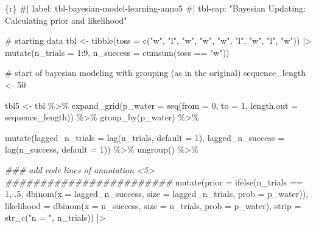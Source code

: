 \documentclass[
  letterpaper,
  DIV=11,
  numbers=noendperiod]{scrreprt}
\newenvironment{Shaded}{\begin{snugshade}}{\end{snugshade}}
\newcommand{\AttributeTok}[1]{\textcolor[rgb]{0.40,0.45,0.13}{#1}}
\newcommand{\CommentTok}[1]{\textcolor[rgb]{0.37,0.37,0.37}{#1}}
\newcommand{\DecValTok}[1]{\textcolor[rgb]{0.68,0.00,0.00}{#1}}
\newcommand{\DocumentationTok}[1]{\textcolor[rgb]{0.37,0.37,0.37}{\textit{#1}}}
\newcommand{\FunctionTok}[1]{\textcolor[rgb]{0.28,0.35,0.67}{#1}}
\newcommand{\InformationTok}[1]{\textcolor[rgb]{0.37,0.37,0.37}{#1}}
\newcommand{\NormalTok}[1]{\textcolor[rgb]{0.00,0.23,0.31}{#1}}
\newcommand{\OtherTok}[1]{\textcolor[rgb]{0.00,0.23,0.31}{#1}}
\newcommand{\SpecialCharTok}[1]{\textcolor[rgb]{0.37,0.37,0.37}{#1}}
\newcommand{\StringTok}[1]{\textcolor[rgb]{0.13,0.47,0.30}{#1}}
\begin{document}
\begin{Shaded}
\begin{Highlighting}[]
\InformationTok{\textasciigrave{}\textasciigrave{}\textasciigrave{}\{r\}}
\CommentTok{\#| label: tbl{-}bayesian{-}model{-}learning{-}anno5}
\CommentTok{\#| tbl{-}cap: "Bayesian Updating: Calculating prior and likelihood"}

\CommentTok{\# starting data}
\NormalTok{tbl }\OtherTok{\textless{}{-}} \FunctionTok{tibble}\NormalTok{(}\AttributeTok{toss =} \FunctionTok{c}\NormalTok{(}\StringTok{"w"}\NormalTok{, }\StringTok{"l"}\NormalTok{, }\StringTok{"w"}\NormalTok{, }\StringTok{"w"}\NormalTok{, }\StringTok{"w"}\NormalTok{, }\StringTok{"l"}\NormalTok{, }\StringTok{"w"}\NormalTok{, }\StringTok{"l"}\NormalTok{, }\StringTok{"w"}\NormalTok{)) }\SpecialCharTok{|\textgreater{}} 
    \FunctionTok{mutate}\NormalTok{(}\AttributeTok{n\_trials  =} \DecValTok{1}\SpecialCharTok{:}\DecValTok{9}\NormalTok{, }\AttributeTok{n\_success =} \FunctionTok{cumsum}\NormalTok{(toss }\SpecialCharTok{==} \StringTok{"w"}\NormalTok{))}

\CommentTok{\# start of bayesian modeling with grouping (as in the original)}
\NormalTok{sequence\_length }\OtherTok{\textless{}{-}} \DecValTok{50}

\NormalTok{tbl5 }\OtherTok{\textless{}{-}}\NormalTok{ tbl }\SpecialCharTok{\%\textgreater{}\%} 
  \FunctionTok{expand\_grid}\NormalTok{(}\AttributeTok{p\_water =} \FunctionTok{seq}\NormalTok{(}\AttributeTok{from =} \DecValTok{0}\NormalTok{, }\AttributeTok{to =} \DecValTok{1}\NormalTok{, }
                            \AttributeTok{length.out =}\NormalTok{ sequence\_length)) }\SpecialCharTok{\%\textgreater{}\%} 
  \FunctionTok{group\_by}\NormalTok{(p\_water) }\SpecialCharTok{\%\textgreater{}\%} 
    
  \FunctionTok{mutate}\NormalTok{(}\AttributeTok{lagged\_n\_trials  =} \FunctionTok{lag}\NormalTok{(n\_trials, }\AttributeTok{default =} \DecValTok{1}\NormalTok{),}
         \AttributeTok{lagged\_n\_success =} \FunctionTok{lag}\NormalTok{(n\_success, }\AttributeTok{default =} \DecValTok{1}\NormalTok{)) }\SpecialCharTok{\%\textgreater{}\%} 
  \FunctionTok{ungroup}\NormalTok{() }\SpecialCharTok{\%\textgreater{}\%} 
    
  \DocumentationTok{\#\#\# add code lines of annotation \textless{}5\textgreater{} \#\#\#\#\#\#\#\#\#\#\#\#\#\#\#\#\#\#\#\#\#\#\#\#}
  \FunctionTok{mutate}\NormalTok{(}\AttributeTok{prior      =} \FunctionTok{ifelse}\NormalTok{(n\_trials }\SpecialCharTok{==} \DecValTok{1}\NormalTok{, .}\DecValTok{5}\NormalTok{,}
                             \FunctionTok{dbinom}\NormalTok{(}\AttributeTok{x    =}\NormalTok{ lagged\_n\_success, }
                                    \AttributeTok{size =}\NormalTok{ lagged\_n\_trials, }
                                    \AttributeTok{prob =}\NormalTok{ p\_water)),}
         \AttributeTok{likelihood =} \FunctionTok{dbinom}\NormalTok{(}\AttributeTok{x    =}\NormalTok{ n\_success, }
                             \AttributeTok{size =}\NormalTok{ n\_trials, }
                             \AttributeTok{prob =}\NormalTok{ p\_water),}
         \AttributeTok{strip      =} \FunctionTok{str\_c}\NormalTok{(}\StringTok{"n = "}\NormalTok{, n\_trials)) }\SpecialCharTok{|\textgreater{}} 
 

\end{Highlighting}
\end{Shaded}
\end{document}
